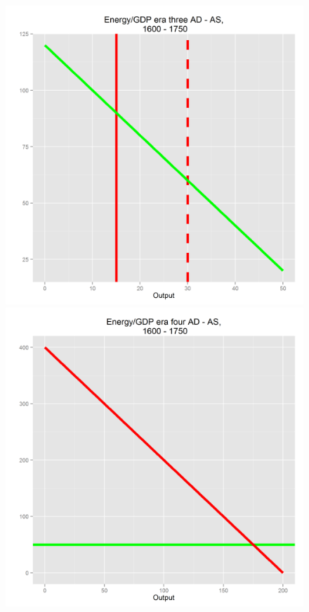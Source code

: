 \documentclass[final]{beamer}
\begin{document}
\begin{frame}
\begin{figure}[p!]
{		}
		\end{figure}
\begin{figure}[p!]
		\label{fig:asad}		
		\centerline{
		\mbox{\includegraphics[height=0.35\textheight]{era3}}
		\mbox{\includegraphics[height=0.35\textheight]{era4}}				
		}
		\end{figure}
\end{frame}
\end{document}

